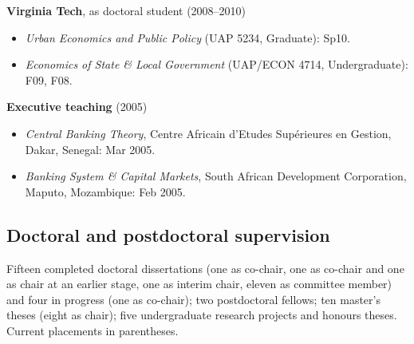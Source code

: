 \documentclass[letter,11pt]{article}
\begin{document}
\vspace{4pt}\noindent\textbf{Virginia Tech}, as doctoral student (2008--2010)
\begin{itemize}[--]
\itemsep0em
    \item \emph{Urban Economics and Public Policy} (UAP 5234, Graduate): Sp10.
    \item \emph{Economics of State \& Local Government} (UAP/ECON 4714, Undergraduate): F09, F08.
\end{itemize}
\vspace{4pt}\noindent\textbf{Executive teaching} (2005)
\begin{itemize}[--]
\itemsep0em
    \item \emph{Central Banking Theory}, Centre Africain d'Etudes Sup\'{e}rieures en Gestion, Dakar, Senegal: Mar 2005.
    \item \emph{Banking System \& Capital Markets}, South African Development Corporation, Maputo, Mozambique: Feb 2005.
\end{itemize}

\subsection*{Doctoral and postdoctoral supervision}
\noindent Fifteen completed doctoral dissertations (one as co-chair, one as co-chair and one as chair at an earlier stage, one as interim chair, eleven as committee member) and four in progress (one as co-chair); two postdoctoral fellows; ten master's theses (eight as chair); five undergraduate research projects and honours theses. Current placements in parentheses.
\end{document}
